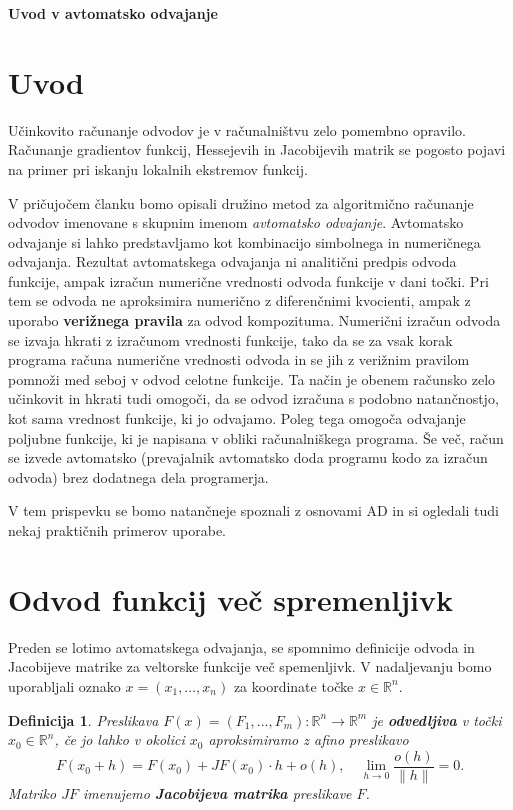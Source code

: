 \documentclass[12pt,slovene]{article}
\newcommand{\RR}{\mathbb R}
\newtheorem{definition}{Definicija}
\begin{document}
\begin{large}\begin{center}
\textbf{Uvod v avtomatsko odvajanje}
\end{center}\end{large}
\bigskip

\section{Uvod}

Učinkovito računanje odvodov je v računalništvu zelo pomembno opravilo. Računanje gradientov funkcij, Hessejevih in Jacobijevih matrik se pogosto pojavi na primer pri iskanju lokalnih ekstremov funkcij. 


V pričujočem članku bomo opisali družino metod za algoritmično računanje odvodov imenovane s skupnim imenom \emph{avtomatsko odvajanje}. Avtomatsko odvajanje si lahko predstavljamo kot kombinacijo simbolnega in numeričnega odvajanja. Rezultat avtomatskega odvajanja ni analitični predpis odvoda funkcije, ampak izračun numerične vrednosti odvoda funkcije v dani točki. Pri tem se odvoda ne aproksimira numerično z diferenčnimi kvocienti, ampak z uporabo \textbf{verižnega pravila} za odvod kompozituma. Numerični izračun odvoda se izvaja hkrati z izračunom vrednosti funkcije, tako da se za vsak korak programa računa numerične vrednosti odvoda in se jih z verižnim pravilom pomnoži med seboj v odvod celotne funkcije. Ta način je obenem računsko zelo učinkovit in hkrati tudi omogoči, da se odvod izračuna s podobno natančnostjo, kot sama vrednost funkcije, ki jo odvajamo. Poleg tega omogoča odvajanje poljubne funkcije, ki je napisana v obliki računalniškega programa. Še več, račun se izvede avtomatsko (prevajalnik avtomatsko doda programu kodo za izračun odvoda) brez dodatnega dela programerja. 

V tem prispevku se bomo natančneje spoznali z osnovami AD in si ogledali tudi nekaj praktičnih primerov uporabe.

\section{Odvod funkcij več spremenljivk}

Preden se lotimo avtomatskega odvajanja, se spomnimo definicije odvoda in Jacobijeve matrike za veltorske funkcije več spemenljivk. V nadaljevanju bomo uporabljali oznako $x=(x_1,\ldots,x_n)$ za koordinate točke $x\in\mathbb{R}^n$.

\begin{definition}
Preslikava $F(x)=(F_1,\ldots,F_m):\RR^n\to\RR^m$ je \textbf{odvedljiva} v točki $x_0\in \mathbb{R}^n$, 
če jo lahko v okolici $x_0$ aproksimiramo z afino preslikavo
    $$F(x_0+h)=F(x_0)+JF(x_0)\cdot h+o(h),\quad \lim_{h\to 0}\frac{o(h)}{\|h\|}=0.$$
Matriko $JF$ imenujemo \textbf{Jacobijeva matrika} preslikave $F$.
\end{definition}
\end{document}
